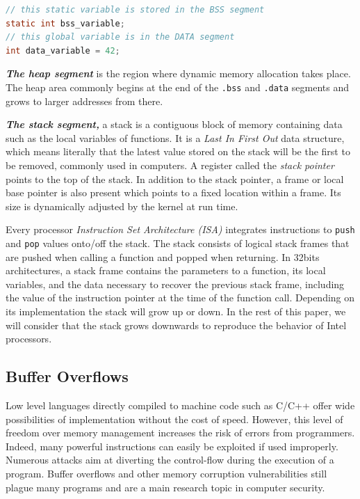 \documentclass[10pt,twocolumn]{article}
\begin{document}
\begin{lstlisting}[aboveskip=\bigskipamount,belowskip=\medskipamount,caption=Variable
location in memory,language=C,label=lst-variable]
// this static variable is stored in the BSS segment
static int bss_variable;
// this global variable is in the DATA segment
int data_variable = 42;
\end{lstlisting}

\textbf{\textit{The heap segment}} is the region where dynamic memory
allocation takes place. The heap area commonly begins at the end of the
\texttt{.bss} and \texttt{.data} segments and grows to larger addresses from
there.

\textit{\textbf{The stack segment,}} a stack is a contiguous block of memory
containing data such as the local variables of functions. It is a \textit{Last In First Out} data structure, which means
literally that the latest value stored on the stack will be the first to be
removed, commonly used
in computers. A register called the \textit{stack pointer} points to
the top of the stack. In addition to the stack pointer, a frame or local base
pointer is also present which points to a fixed location within a frame. Its
size is dynamically adjusted by the kernel at run time.

Every processor \textit{Instruction Set Architecture (ISA)} integrates
instructions to \texttt{push} and \texttt{pop} values onto/off the stack. The
stack consists of logical stack frames that are pushed when calling a function
and popped when returning. In 32bits architectures, a stack frame contains the
parameters to a function, its local variables, and the data necessary to
recover the previous stack frame, including the value of the instruction
pointer at the time of the function call. Depending on its implementation the
stack will grow up or down. In the rest of this paper, we will consider that
the stack grows downwards to reproduce the behavior of Intel processors.

\subsection{Buffer Overflows}

Low level languages directly compiled to machine code such as C/C++ offer wide
possibilities of implementation without the cost of speed. However, this level
of freedom over memory management increases the risk of errors from programmers.
Indeed, many powerful instructions can easily be exploited if used improperly.
Numerous attacks aim at diverting the control-flow during the execution of a
program. Buffer overflows and other memory corruption vulnerabilities still plague many programs and are a main research
topic in computer
security\cite{DBLP:journals/iee/MouzaraniSZ16,DBLP:journals/iee/PadmanabhuniT16,DBLP:conf/ant/LeonB16}.
\end{document}
